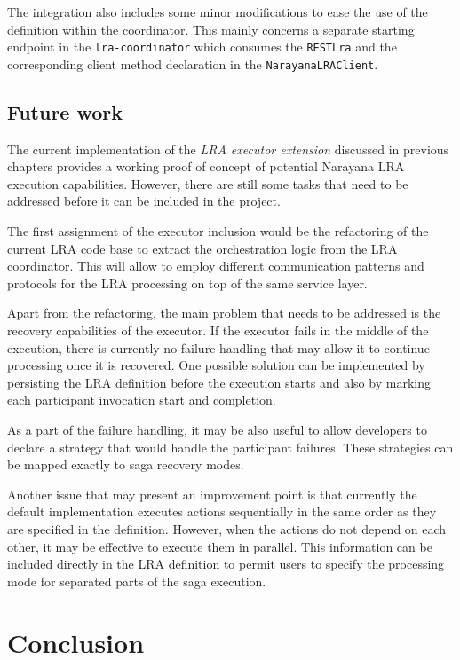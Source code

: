 \documentclass[oneside,
  digital, %
  table,   %
  nolof,     %
  nolot,     %
]{fithesis3}
\begin{document}
The integration also includes some minor modifications to ease the use of the definition within the coordinator. This mainly concerns a separate starting endpoint in the \texttt{lra-coordinator} which consumes the \texttt{RESTLra} and the corresponding client method declaration in the \texttt{NarayanaLRAClient}.

\section{Future work}

The current implementation of the \textit{LRA executor extension} discussed in previous chapters provides a working proof of concept of potential Narayana LRA execution capabilities. However, there are still some tasks that need to be addressed before it can be included in the project.

The first assignment of the executor inclusion would be the refactoring of the current LRA code base to extract the orchestration logic from the LRA coordinator. This will allow to employ different communication patterns and protocols for the LRA processing on top of the same service layer. 

Apart from the refactoring, the main problem that needs to be addressed is the recovery capabilities of the executor. If the executor fails in the middle of the execution, there is currently no failure handling that may allow it to continue processing once it is recovered. One possible solution can be implemented by persisting the LRA definition before the execution starts and also by marking each participant invocation start and completion.

As a part of the failure handling, it may be also useful to allow developers to declare a strategy that would handle the participant failures. These strategies can be mapped exactly to saga recovery modes. 

Another issue that may present an improvement point is that currently the default implementation executes actions sequentially in the same order as they are specified in the definition. However, when the actions do not depend on each other, it may be effective to execute them in parallel. This information can be included directly in the LRA definition to permit users to specify the processing mode for separated parts of the saga execution.


\clearpage
\chapter{Conclusion}
\end{document}

